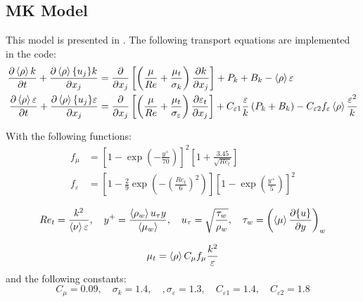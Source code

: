 



\subsection{MK Model}
This model is presented in \cite{myong1990new}.
The following transport equations are implemented in the code:
\begin{equation} \label{eq:ktDeng}
\begin{split}
\frac{\partial \left<{\rho}\right> k}{\partial { t}} + \frac{\partial \left<{\rho}\right> \{{u_j}\} k}{\partial {x_j}} &= \frac{\partial}{\partial x_j}\left[\left(\frac{\mu}{Re} + \frac{\mu_t}{\sigma_k}\right)\frac{\partial k}{\partial {x_j}}\right] + P_{k} + B_k- \left<{\rho}\right>\varepsilon \\
\frac{\partial  \left<{\rho}\right> \varepsilon}{\partial {t}} + \frac{\partial  \left<{\rho}\right> \{{u_j}\} \varepsilon}{\partial { x_j}} &= \frac{\partial}{\partial x_j}\left[ \left(\frac{\mu}{Re} + \frac{\mu_t}{\sigma_{\varepsilon}}\right)\frac{\partial  \varepsilon_t}{\partial {x_j}}\right] + C_{\varepsilon1}\frac{\varepsilon}{k}\left(P_k+B_k\right)  -C_{\varepsilon2} f_{\varepsilon}\left<{\rho}\right>\frac{\varepsilon^2}{k}   
\end{split}
\end{equation}

With the following functions:
\begin{equation}
\begin{split}
    f_\mu &= \left[1-\exp\left(-\frac{y^+}{70}\right)\right]^2\left[1+\frac{3.45}{\sqrt{Re_t}}\right] \\
    f_\varepsilon  &=\left[1-\frac{2}{9}\exp\left(-\left(\frac{Re_t}{6}\right)^2\right)\right] \left[1-\exp\left(\frac{y^+}{5}\right)\right]^2 
\end{split}
\end{equation}

\begin{equation}
Re_t = \frac{k^2}{\left<{\nu}\right> \varepsilon}, \quad y^+ =  \frac{\left<{\rho_w}\right> u_\tau y }{\left<{\mu_w}\right>}, \quad u_\tau = \sqrt{\frac{\tau_w}{\rho_w}}, \quad \tau_w = \left(\left<{\mu}\right>\frac{\partial  \{{u}\}}{\partial {y}}\right)_w
\end{equation}

\begin{equation}
\mu_t = \left<{\rho}\right> C_\mu f_\mu \frac{k^2}{\varepsilon}
\end{equation}
and the following constants:
\begin{equation}
C_\mu = 0.09, \quad \sigma_k = 1.4, \quad, \sigma_\varepsilon = 1.3, \quad C_{\varepsilon1} = 1.4, \quad C_{\varepsilon2}=1.8
\end{equation}
